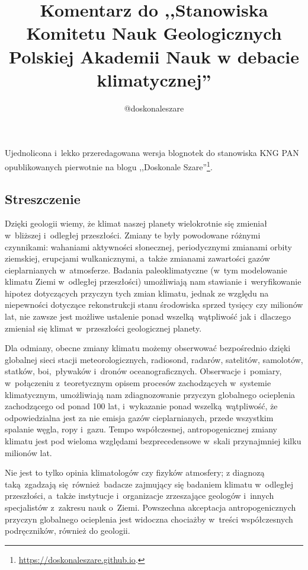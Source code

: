 \documentclass[12pt]{article}
\title{Komentarz do ,,Stanowiska Komitetu Nauk Geologicznych Polskiej Akademii Nauk w debacie klimatycznej''}
\author{@doskonaleszare}
\begin{document}
\maketitle

Ujednolicona i~lekko przeredagowana wersja blognotek do stanowiska KNG PAN opublikowanych pierwotnie na blogu ,,Doskonale Szare''\footnote{\url{https://doskonaleszare.github.io}.}.

\subsection*{Streszczenie}

Dzięki geologii wiemy, że klimat naszej planety wielokrotnie się zmieniał w~bliższej i~odległej przeszłości. Zmiany te były powodowane różnymi czynnikami: wahaniami aktywności słonecznej, periodycznymi zmianami orbity ziemskiej, erupcjami wulkanicznymi, a~także zmianami zawartości gazów cieplarnianych w~atmosferze. Badania paleoklimatyczne (w~tym modelowanie klimatu Ziemi w~odległej przeszłości) umożliwiają nam stawianie i~weryfikowanie hipotez dotyczących przyczyn tych zmian klimatu, jednak ze względu na niepewności dotyczące rekonstrukcji stanu środowiska sprzed tysięcy czy milionów lat, nie zawsze jest możliwe ustalenie ponad wszelką wątpliwość jak i~dlaczego zmieniał się klimat w~przeszłości geologicznej planety.

Dla odmiany, obecne zmiany klimatu możemy obserwować bezpośrednio dzięki globalnej sieci stacji meteorologicznych, radiosond, radarów, satelitów, samolotów, statków, boi,~pływaków i~dronów oceanograficznych. Obserwacje i~pomiary, w~połączeniu z~teoretycznym opisem procesów zachodzących w~systemie klimatycznym, umożliwiają nam zdiagnozowanie przyczyn globalnego ocieplenia zachodzącego od ponad 100 lat, i~wykazanie ponad wszelką wątpliwość, że odpowiedzialna jest za nie emisja gazów cieplarnianych, przede wszystkim spalanie węgla, ropy i~gazu. Tempo współczesnej, antropogenicznej zmiany klimatu jest pod wieloma względami bezprecedensowe w~skali przynajmniej kilku milionów lat.

Nie jest to tylko opinia klimatologów czy fizyków atmosfery; z diagnozą taką zgadzają się również badacze zajmujący się badaniem klimatu w~odległej przeszłości, a~także instytucje i~organizacje zrzeszające geologów i~innych specjalistów z~zakresu nauk o~Ziemi. Powszechna akceptacja antropogenicznych przyczyn globalnego ocieplenia jest widoczna chociażby w~treści współczesnych podręczników, również do geologii.
\end{document}
